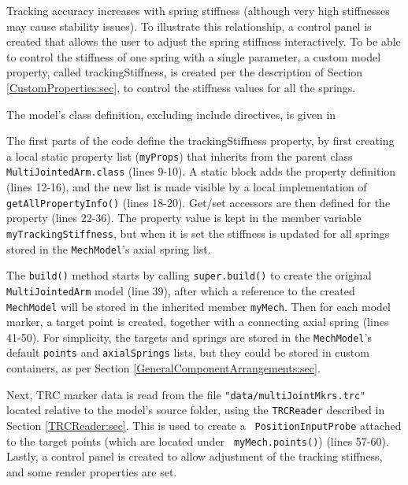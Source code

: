 Tracking accuracy increases with spring stiffness (although very high
stiffnesses may cause stability issues). To illustrate this relationship, a
control panel is created that allows the user to adjust the spring stiffness
interactively. To be able to control the stiffness of one spring with a single
parameter, a custom model property, called {\sf trackingStiffness}, is created
per the description of Section \ref{CustomProperties:sec}, to control the
stiffness values for all the springs.

The model's class definition, excluding include directives, is given in
%
\lstset{numbers=left}
\iflatexml

\else

\fi
\lstset{numbers=none}
%
The first parts of the code define the {\sf trackingStiffness} property, by
first creating a local static property list ({\tt myProps}) that inherits from
the parent class {\tt MultiJointedArm.class} (lines 9-10). A static block adds
the property definition (lines 12-16), and the new list is made visible by a
local implementation of {\tt getAllPropertyInfo()} (lines 18-20).  Get/set
accessors are then defined for the property (lines 22-36). The property value
is kept in the member variable {\tt myTrackingStiffness}, but when it is set
the stiffness is updated for all springs stored in the {\tt MechModel}'s axial
spring list.

The {\tt build()} method starts by calling {\tt super.build()} to create the
original {\tt MultiJointedArm} model (line 39), after which a reference to the
created {\tt MechModel} will be stored in the inherited member {\tt myMech}.
Then for each model marker, a target point is created, together with a
connecting axial spring (lines 41-50). For simplicity, the targets and springs
are stored in the {\tt MechModel}'s default {\tt points} and {\tt axialSprings}
lists, but they could be stored in custom containers, as per
Section \ref{GeneralComponentArrangements:sec}.

Next, TRC marker data is read from the file {\tt "data/multiJointMkrs.trc"}
located relative to the model's source folder, using the {\tt TRCReader}
described in Section \ref{TRCReader:sec}. This is used to create a {\tt
PositionInputProbe} attached to the target points (which are located under {\tt
myMech.points()}) (lines 57-60). Lastly, a control panel is created to allow
adjustment of the tracking stiffness, and some render properties are set.

